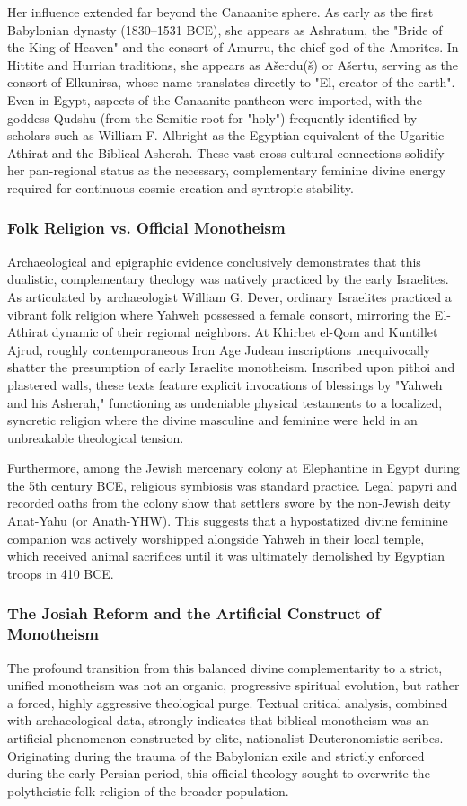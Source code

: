 \documentclass[aps,prd,11pt,onecolumn,superscriptaddress,nofootinbib,floatfix]{revtex4-2}
\begin{document}
Her influence extended far beyond the Canaanite sphere. As early as the first Babylonian dynasty (1830–1531 BCE), she appears as Ashratum, the "Bride of the King of Heaven" and the consort of Amurru, the chief god of the Amorites. In Hittite and Hurrian traditions, she appears as Ašerdu(š) or Ašertu, serving as the consort of Elkunirsa, whose name translates directly to "El, creator of the earth". Even in Egypt, aspects of the Canaanite pantheon were imported, with the goddess Qudshu (from the Semitic root for "holy") frequently identified by scholars such as William F. Albright as the Egyptian equivalent of the Ugaritic Athirat and the Biblical Asherah. These vast cross-cultural connections solidify her pan-regional status as the necessary, complementary feminine divine energy required for continuous cosmic creation and syntropic stability.


\subsubsection{Folk Religion vs. Official Monotheism}
Archaeological and epigraphic evidence conclusively demonstrates that this dualistic, complementary theology was natively practiced by the early Israelites. As articulated by archaeologist William G. Dever, ordinary Israelites practiced a vibrant folk religion where Yahweh possessed a female consort, mirroring the El-Athirat dynamic of their regional neighbors. At Khirbet el-Qom and Kuntillet Ajrud, roughly contemporaneous Iron Age Judean inscriptions unequivocally shatter the presumption of early Israelite monotheism. Inscribed upon pithoi and plastered walls, these texts feature explicit invocations of blessings by "Yahweh and his Asherah," functioning as undeniable physical testaments to a localized, syncretic religion where the divine masculine and feminine were held in an unbreakable theological tension.


Furthermore, among the Jewish mercenary colony at Elephantine in Egypt during the 5th century BCE, religious symbiosis was standard practice. Legal papyri and recorded oaths from the colony show that settlers swore by the non-Jewish deity Anat-Yahu (or Anath-YHW). This suggests that a hypostatized divine feminine companion was actively worshipped alongside Yahweh in their local temple, which received animal sacrifices until it was ultimately demolished by Egyptian troops in 410 BCE.


\subsubsection{The Josiah Reform and the Artificial Construct of Monotheism}
The profound transition from this balanced divine complementarity to a strict, unified monotheism was not an organic, progressive spiritual evolution, but rather a forced, highly aggressive theological purge. Textual critical analysis, combined with archaeological data, strongly indicates that biblical monotheism was an artificial phenomenon constructed by elite, nationalist Deuteronomistic scribes. Originating during the trauma of the Babylonian exile and strictly enforced during the early Persian period, this official theology sought to overwrite the polytheistic folk religion of the broader population.
\end{document}
